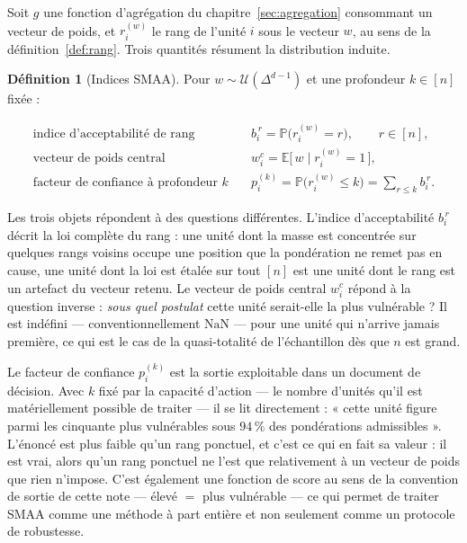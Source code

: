 \documentclass[11pt,a4paper]{article}
\theoremstyle{definition}
\newtheorem{definition}{Définition}[section]
\theoremstyle{remark}
\newcommand{\PP}{\mathbb{P}}
\newcommand{\EE}{\mathbb{E}}
\newcommand{\Unif}{\mathcal{U}}
\newcommand{\simplex}{\Delta^{d-1}}
\begin{document}
\medskip

Soit $g$ une fonction d'agrégation du chapitre~\ref{sec:agregation} consommant un vecteur
de poids, et $r^{(w)}_i$ le rang de l'unité $i$ sous le vecteur $w$, au sens de la
définition~\ref{def:rang}. Trois quantités résument la distribution induite.

\medskip

\begin{definition}[Indices SMAA]
  \label{def:smaa}
  Pour $w \sim \Unif(\simplex)$ et une profondeur $k \in [n]$ fixée :

  \medskip

  \begin{align*}
    \text{indice d'acceptabilité de rang} \quad
      & b^{\,r}_i = \PP\big(r^{(w)}_i = r\big), \qquad r \in [n], \\[0.2em]
    \text{vecteur de poids central} \quad
      & w^{c}_i = \EE\big[\,w \mid r^{(w)}_i = 1\,\big], \\[0.2em]
    \text{facteur de confiance à profondeur } k \quad
      & p^{(k)}_i = \PP\big(r^{(w)}_i \le k\big) = \sum_{r \le k} b^{\,r}_i .
  \end{align*}
\end{definition}

\bigskip

Les trois objets répondent à des questions différentes. L'indice d'acceptabilité
$b^{\,r}_i$ décrit la loi complète du rang : une unité dont la masse est concentrée sur
quelques rangs voisins occupe une position que la pondération ne remet pas en cause, une
unité dont la loi est étalée sur tout $[n]$ est une unité dont le rang est un artefact du
vecteur retenu. Le vecteur de poids central $w^{c}_i$ répond à la question inverse :
\emph{sous quel postulat} cette unité serait-elle la plus vulnérable ? Il est indéfini
--- conventionnellement $\mathrm{NaN}$ --- pour une unité qui n'arrive jamais première,
ce qui est le cas de la quasi-totalité de l'échantillon dès que $n$ est grand.

\bigskip

Le facteur de confiance $p^{(k)}_i$ est la sortie exploitable dans un document de
décision. Avec $k$ fixé par la capacité d'action --- le nombre d'unités qu'il est
matériellement possible de traiter --- il se lit directement : « cette unité figure parmi
les cinquante plus vulnérables sous $94\,\%$ des pondérations admissibles ». L'énoncé est
plus faible qu'un rang ponctuel, et c'est ce qui en fait sa valeur : il est vrai, alors
qu'un rang ponctuel ne l'est que relativement à un vecteur de poids que rien n'impose.
C'est également une fonction de score au sens de la convention de sortie de cette note
--- élevé $=$ plus vulnérable --- ce qui permet de traiter SMAA comme une méthode à part
entière et non seulement comme un protocole de robustesse.
\end{document}
